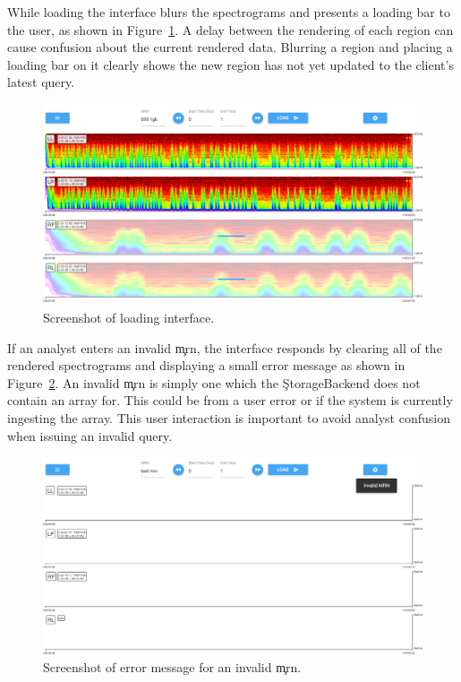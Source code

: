 While loading the interface blurs the spectrograms and presents a loading bar
to the user, as shown in Figure~\ref{fig:loading}. A delay between the
rendering of each region can cause confusion about the current rendered data.
Blurring a region and placing a loading bar on it clearly shows the new region
has not yet updated to the client's latest query. \\

\begin{figure}[h]
\begin{center}
\includegraphics[scale=0.35]{./img/loading.png}
\caption{Screenshot of loading interface.}
\label{fig:loading}
\end{center}
\end{figure}

If an analyst enters an invalid \c{mrn}, the interface responds by clearing all
of the rendered spectrograms and displaying a small error message as shown in
Figure~\ref{fig:error}. An invalid \c{mrn} is simply one which the
\c{StorageBackend} does not contain an array for. This could be from a user
error or if the system is currently ingesting the array. This user interaction
is important to avoid analyst confusion when issuing an invalid query. \\

\begin{figure}[h]
\begin{center}
\includegraphics[scale=0.35]{./img/error.png}
\caption{Screenshot of error message for an invalid \c{mrn}.}
\label{fig:error}
\end{center}
\end{figure}


